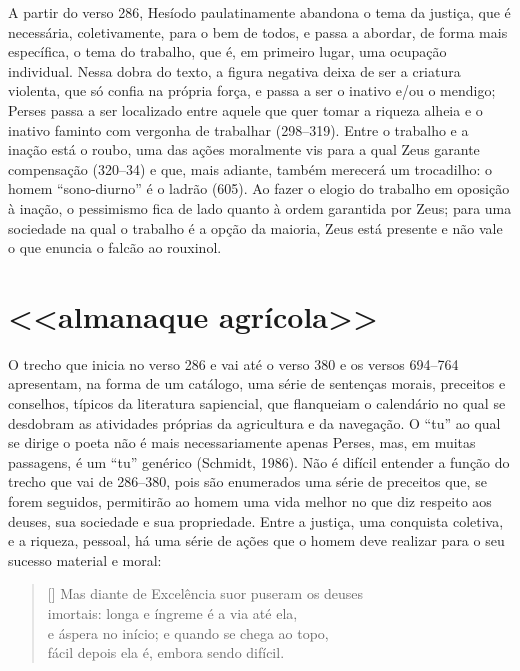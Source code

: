 A partir do verso 286, Hesíodo paulatinamente abandona o tema da
justiça, que é necessária, coletivamente, para o bem de todos, e passa
a abordar, de forma mais específica, o tema do trabalho, que é, em
primeiro lugar, uma ocupação individual. Nessa dobra do texto, a figura
negativa deixa de ser a criatura violenta, que só confia na própria
força, e passa a ser o inativo e/ou o mendigo; Perses passa a ser
localizado entre aquele que quer tomar a riqueza alheia e o inativo
faminto com vergonha de trabalhar (298--319). Entre o trabalho e a
inação está o roubo, uma das ações moralmente vis para a qual Zeus
garante compensação (320--34) e que, mais adiante, também merecerá um
trocadilho: o homem “sono-diurno” é o ladrão (605). Ao fazer o elogio
do trabalho em oposição à inação, o pessimismo fica de lado quanto à
ordem garantida por Zeus; para uma sociedade na qual o trabalho é a
opção da maioria, Zeus está presente e não vale o que enuncia o falcão
ao rouxinol.

\section{<<almanaque agrícola>>}

O trecho que inicia no verso 286 e vai até o verso 380 e os versos
694--764 apresentam, na forma de um catálogo, uma série de sentenças
morais, preceitos e conselhos, típicos da literatura sapiencial, que
flanqueiam o calendário no qual se desdobram as atividades próprias da
agricultura e da navegação. O “tu” ao qual se dirige o poeta não é mais
necessariamente apenas Perses, mas, em muitas passagens, é um “tu”
genérico (Schmidt, 1986). Não é difícil entender a função do trecho
que vai de 286--380, pois são enumerados uma série de preceitos que, se
forem seguidos, permitirão ao homem uma vida melhor no que diz respeito
aos deuses, sua sociedade e sua propriedade. Entre a justiça, uma
conquista coletiva, e a riqueza, pessoal, há uma série de ações que o
homem deve realizar para o seu sucesso material e moral: 



\begin{verse}[\versewidth]
  Mas diante de Excelência suor puseram os deuses\\
  imortais: longa e íngreme é a via até ela,\\
  e áspera no início; e quando se chega ao topo,\\
  fácil depois ela é, embora sendo difícil.
\end{verse}

